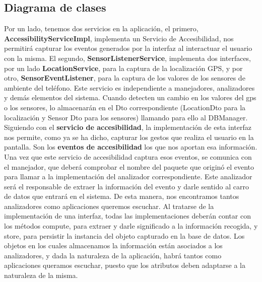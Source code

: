 \documentclass[12pt,a4paper,oneside]{book} %
\begin{document}
\subsection{Diagrama de clases}
Por un lado, tenemos dos servicios en la aplicación, el primero, \textbf{AccessibilityServiceImpl}, implementa un Servicio de Accesibilidad, nos permitirá capturar los eventos generados por la interfaz al interactuar el usuario con la misma.
\newline \newline
El segundo, \textbf{SensorListenerService}, implementa dos interfaces, por un lado \textbf{LocationService}, para la captura de la localización GPS, y por otro, \textbf{SensorEventListener}, para la captura de los valores de los sensores de ambiente del teléfono. 
\newline \newline
Este servicio es independiente a manejadores, analizadores y demás elementos del sistema. Cuando detecten un cambio en los valores del gps o los sensores, lo almacenarán en el Dto correspondiente (LocationDto para la localización y Sensor Dto para los sensores) llamando para ello al DBManager. 
\newline \newline
Siguiendo con el \textbf{servicio de accesibilidad}, la implementación de esta interfaz nos permite, como ya se ha dicho, capturar los gestos que realiza el usuario en la pantalla. Son los \textbf{eventos de accesibilidad} los que nos aportan esa información. 
\newline \newline
Una vez que este servicio de accesibilidad captura esos eventos, se comunica con el manejador, que deberá comprobar el nombre del paquete que originó el evento para llamar a la implementación del analizador correspondiente. Este analizador será el responsable de extraer la información del evento y darle sentido al carro de datos que entrará en el sistema. 
\newline \newline
De esta manera, nos encontramos tantos analizadores como aplicaciones queremos escuchar. Al tratarse de la implementación de una interfaz, todas las implementaciones deberán contar con los métodos compute, para extraer y darle significado a la información recogida, y store, para persistir la instancia del objeto capturado en la base de datos. 
\newline \newline
Los objetos en los cuales almacenamos la información están asociados a los analizadores, y dada la naturaleza de la aplicación, habrá tantos como aplicaciones queramos escuchar, puesto que los atributos deben adaptarse a la naturaleza de la misma. 
\end{document}
